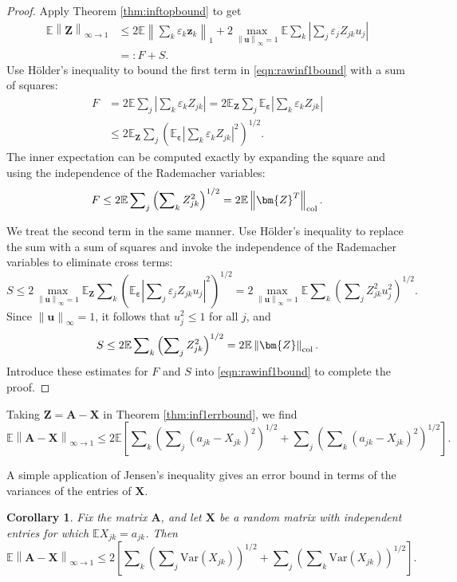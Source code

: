 \documentclass[11pt,letterpaper,twoside,reqno]{amsart}
\newcommand{\mat}[1]{\ensuremath{\bm{#1}}}
\newcommand{\E}{\ensuremath{\mathbb{E}}}
\newcommand{\supoverinfball}{\ensuremath{\max_{\infnorm{\mat{u}} = 1}}}
\newcommand{\norm}[1]{\ensuremath{\left\|#1\right\|}}
\newcommand{\infnorm}[1]{\ensuremath{\left\|#1\right\|_\infty}}
\newcommand{\infonorm}[1]{\ensuremath{\left\|#1\right\|_{\infty\rightarrow 1}}}
\newcommand{\colnorm}[1]{\ensuremath{\left\|#1\right\|_{\text{\rm col}}}}
\newcommand{\var}[1]{\ensuremath{\mathrm{Var}(#1)}}
\newcommand{\eqqcolon}{=\mathrel{\mathop:}} %
\newtheorem{cor}{Corollary}
\begin{document}
\begin{proof}
Apply Theorem \ref{thm:inftopbound} to get 
\begin{equation}
\begin{aligned}
\E\norm{\mat{Z}}_{\infty\rightarrow1} & \leq2\E\norm{\sum\nolimits_{k}\varepsilon_{k}\mat{z}_{k}}_{1}+2\supoverinfball\E\sum\nolimits_{k}\left|\sum\nolimits_{j}\varepsilon_{j}Z_{jk}u_{j}\right| \\
 & \eqqcolon F + S.
\end{aligned}
\label{eqn:rawinf1bound}
\end{equation}
Use H\"older's inequality to bound the first term in \eqref{eqn:rawinf1bound} with a sum of squares:
\begin{align*}
F & =2\E\sum\nolimits_{j}\left|\sum\nolimits_{k}\varepsilon_{k}Z_{jk}\right|=2\E_{\mat{Z}}\sum\nolimits_{j}\E_{\boldsymbol{\varepsilon}}\left|\sum\nolimits_{k}\varepsilon_{k}Z_{jk}\right|\\
 & \leq2\E_{\mat{Z}}\sum\nolimits_{j}\left(\E_{\boldsymbol{\varepsilon}}\left|\sum\nolimits_{k}\varepsilon_{k}Z_{jk}\right|^{2}\right)^{1/2}.
\end{align*}
The inner expectation can be computed exactly by expanding the square and using the independence of the Rademacher variables:
\[
F \leq 2\E\sum\nolimits_{j}\left(\sum\nolimits_{k}Z_{jk}^{2}\right)^{1/2}=2\E\colnorm{\mat{Z}^{T}}.
\]

We treat the second term in the same manner. Use H\"older's inequality to replace the sum with a sum of squares and invoke the independence of the Rademacher variables to eliminate cross terms:
\[
S \leq2\supoverinfball\E_{\mat{Z}}\sum\nolimits_{k}\left(\E_{\boldsymbol{\varepsilon}}\left|\sum\nolimits_{j}\varepsilon_{j}Z_{jk}u_{j}\right|^{2}\right)^{1/2}
 = 2\supoverinfball\E\sum\nolimits_{k}\left(\sum\nolimits_{j}Z_{jk}^{2}u_{j}^{2}\right)^{1/2}.
\]
Since $\infnorm{\mat{u}}=1$, it follows that $u_{j}^{2}\leq1$ for all $j$, and 
\[
S \leq2\E\sum\nolimits_{k}\left(\sum\nolimits_{j}Z_{jk}^{2}\right)^{1/2}=2\E\colnorm{\mat{Z}}.
\]
Introduce these estimates for $F$ and $S$ into \eqref{eqn:rawinf1bound} to complete the proof.
\end{proof}

Taking $\mat{Z}=\mat{A}-\mat{X}$ in Theorem \ref{thm:inf1errbound},
we find 
\[
\E\infonorm{\mat{A}-\mat{X}}\leq2\E\left[\sum\nolimits_{k}\left(\sum\nolimits_{j}(a_{jk}-X_{jk})^{2}\right)^{1/2}+\sum\nolimits_{j}\left(\sum\nolimits_{k}(a_{jk}-X_{jk})^{2}\right)^{1/2}\right].\]

A simple application of Jensen's inequality gives an error bound in terms of the variances of the entries of $\mat{X}$. 
\begin{cor}
Fix the matrix $\mat{A}$, and let $\mat{X}$ be a random matrix with independent entries for which $\E X_{jk}=a_{jk}$. Then 
\[
\E\infonorm{\mat{A}-\mat{X}}\leq2\left[\sum\nolimits_{k}\left(\sum\nolimits_{j}\var{X_{jk}}\right)^{1/2}+\sum\nolimits_{j}\left(\sum\nolimits_{k}\var{X_{jk}}\right)^{1/2}\right].
\]
\label{cor:inf1errbound}
\end{cor}
\end{document}
